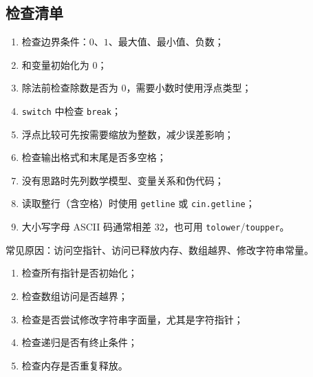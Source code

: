 \documentclass[UTF8,fontset=fandol,zihao=5]{ctexart}
\newcommand{\code}[1]{\texttt{#1}}
\begin{document}
\subsection{检查清单}

\begin{method}[程序检查]
\begin{enumerate}
  \item 检查边界条件：$0$、$1$、最大值、最小值、负数；
  \item 和变量初始化为 $0$；
  \item 除法前检查除数是否为 $0$，需要小数时使用浮点类型；
  \item \code{switch} 中检查 \code{break}；
  \item 浮点比较可先按需要缩放为整数，减少误差影响；
  \item 检查输出格式和末尾是否多空格；
  \item 没有思路时先列数学模型、变量关系和伪代码；
  \item 读取整行（含空格）时使用 \code{getline} 或 \code{cin.getline}；
  \item 大小写字母 ASCII 码通常相差 $32$，也可用 \code{tolower}/\code{toupper}。
\end{enumerate}
\end{method}

\begin{method}[段错误检查]
常见原因：访问空指针、访问已释放内存、数组越界、修改字符串常量。
\begin{enumerate}
  \item 检查所有指针是否初始化；
  \item 检查数组访问是否越界；
  \item 检查是否尝试修改字符串字面量，尤其是字符指针；
  \item 检查递归是否有终止条件；
  \item 检查内存是否重复释放。
\end{enumerate}
\end{method}
\end{document}
